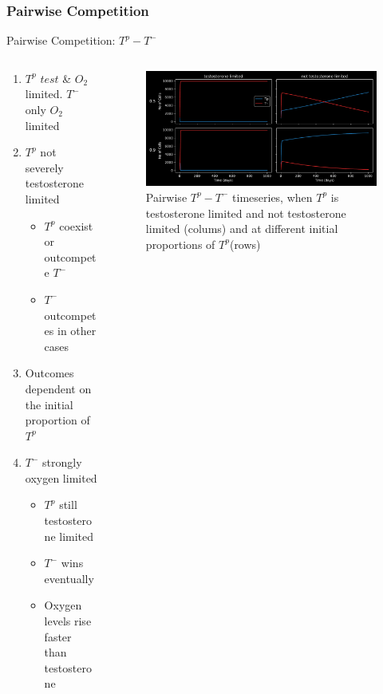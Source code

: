 \documentclass[aspectratio=169,9pt]{beamer}
\begin{document}
\subsubsection{Pairwise Competition}
\begin{frame}{Pairwise Competition: $T^p - T^-$}
  \begin{columns}
    \begin{column}{0.5\textwidth}
      \begin{enumerate}
        \item<1-> $T^p$ $test$ \& $O_2$ limited. $T^-$ only $O_2$ limited
        \item<2-> $T^p$ not severely testosterone limited
        \begin{itemize}
          \item $T^p$ coexist or outcompete $T^-$
          \item $T^-$ outcompetes in other cases
        \end{itemize}
        \item<3-> Outcomes dependent on the initial proportion of $T^p$
        \item<4-> $T^-$ strongly oxygen limited
        \begin{itemize}
          \item $T^p$ still testosterone limited
          \item $T^-$ wins eventually
          \item Oxygen levels rise faster than testosterone
        \end{itemize}
      \end{enumerate}
    \end{column}
    \begin{column}{0.5\textwidth}
      \begin{figure}[h]
        \centering
        \includegraphics[width=\textwidth]{Tpro-Tneg_testlim}
        \caption{Pairwise $T^p - T^-$ timeseries, when $T^p$ is testosterone limited and not testosterone limited (colums) and at different initial proportions of $T^p$(rows)}

\end{figure}
\end{column}
\end{columns}
\end{frame}
\end{document}
